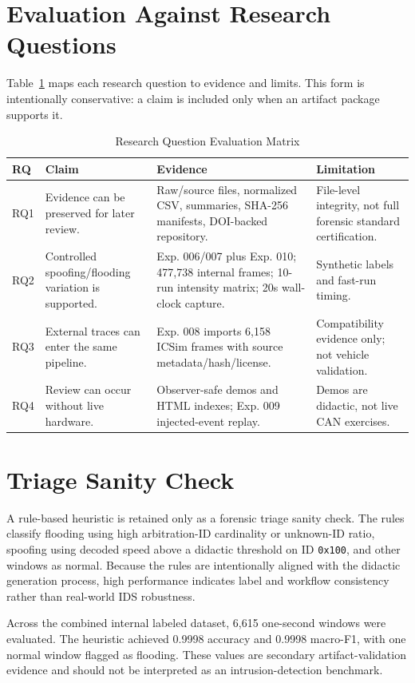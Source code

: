 \documentclass[conference]{IEEEtran}
\begin{document}
\section{Evaluation Against Research Questions}
Table~\ref{tab:rq} maps each research question to evidence and limits. This form is intentionally conservative: a claim is included only when an artifact package supports it.

\begin{table}[t]
\caption{Research Question Evaluation Matrix}
\label{tab:rq}
\centering
\footnotesize
\begin{tabular}{p{}p{}p{}p{}}
\toprule
RQ & Claim & Evidence & Limitation \\
\midrule
RQ1 & Evidence can be preserved for later review. & Raw/source files, normalized CSV, summaries, SHA-256 manifests, DOI-backed repository. & File-level integrity, not full forensic standard certification. \\
RQ2 & Controlled spoofing/flooding variation is supported. & Exp. 006/007 plus Exp. 010; 477,738 internal frames; 10-run intensity matrix; 20s wall-clock capture. & Synthetic labels and fast-run timing. \\
RQ3 & External traces can enter the same pipeline. & Exp. 008 imports 6,158 ICSim frames with source metadata/hash/license. & Compatibility evidence only; not vehicle validation. \\
RQ4 & Review can occur without live hardware. & Observer-safe demos and HTML indexes; Exp. 009 injected-event replay. & Demos are didactic, not live CAN exercises. \\
\bottomrule
\end{tabular}
\end{table}

\section{Triage Sanity Check}
A rule-based heuristic is retained only as a forensic triage sanity check. The rules classify flooding using high arbitration-ID cardinality or unknown-ID ratio, spoofing using decoded speed above a didactic threshold on ID \texttt{0x100}, and other windows as normal. Because the rules are intentionally aligned with the didactic generation process, high performance indicates label and workflow consistency rather than real-world IDS robustness.

Across the combined internal labeled dataset, 6,615 one-second windows were evaluated. The heuristic achieved 0.9998 accuracy and 0.9998 macro-F1, with one normal window flagged as flooding. These values are secondary artifact-validation evidence and should not be interpreted as an intrusion-detection benchmark.
\end{document}
